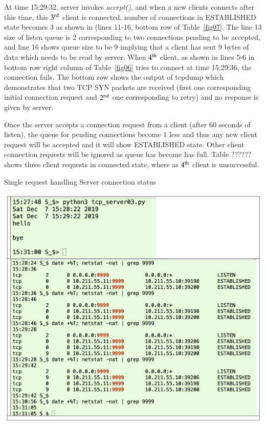 \begin{multicols}{2}

At time 15:29:32, server invokes \textit{accept()}, and when a new clients connects after this time, this $3^{\rm rd}$ client is connected, number of connections in ESTABLISHED state becomes 3 as shown in (lines 11-16, bottom row of Table~\ref{fig07}. The line 13 size of listen queue is 2 corresponding to two connections pending to be accepted, and line 16 shows queue size to be 9 implying that a client has sent 9 bytes of data which needs to be read by server. When $4^{\rm th}$ client, as shown in lines 5-6 in bottom row right column of Table~\ref{fig06} tries to connect at time 15:29:36, the connection fails. The bottom row shows the output of tcpdump which demonstrates that two TCP SYN packets are received (first one corresponding initial connection request and $2^{\rm nd}$ one corresponding to retry) and no response is given by server.

Once the server accepts a connection request from a client (after 60 seconds of listen), the queue for pending connections become 1 less and thus any new client request will be accepted and it will show ESTABLISHED state. Other client connection requests will be ignored as queue has become has full. Table ?????? shows three client requests in connected state, where as $4^{\rm th}$ client is unsuccessful.
\end{multicols}



\begin{table}[H]
\centering
\caption{Single request handling Server connection status}\label{fig07}
\includegraphics[scale=3.45]{src/Figures/chap1/fig07.jpg}
\end{table}

